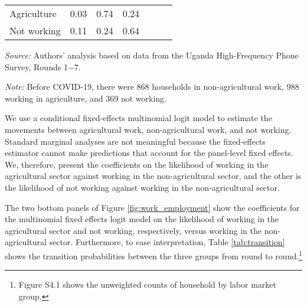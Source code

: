 \documentclass{wber}
\begin{document}
\begin{table}[hbtp!]
\begin{center}
\begin{footnotesize}
\begin{threeparttable}
\begin{tabular}{@{} l D{.}{.}{1.2} D{.}{.}{1.2} D{.}{.}{1.2}  D{.}{.}{1.2} D{.}{.}{1.2} D{.}{.}{1.2} @{}}
 Agriculture & 0.03 & 0.74 & 0.24 &  &  &  \\ 
 Not working & 0.11 & 0.24 & 0.64 &  &  &  \\ 
 \bottomrule
\end{tabular}
\begin{tablenotes}
\item \scriptsize \textit{Source:} Authors' analysis based on data from the Uganda High-Frequency Phone Survey, Rounds 1−7.
\item \scriptsize \textit{Note:} Before COVID-19, there were  868  households in non-agricultural work, 
988  working in agriculture, and  369  not working. 
\end{tablenotes}
\end{threeparttable}
\end{footnotesize}
\end{center}
\end{table}


We use a conditional fixed-effects multinomial logit model to estimate
the movements between agricultural work, non-agricultural work, and not
working. Standard marginal analyses are not meaningful because the
fixed-effects estimator cannot make predictions that account for the
panel-level fixed effects. We, therefore, present the coefficients on
the likelihood of working in the agricultural sector against working in
the non-agricultural sector, and the other is the likelihood of not
working against working in the non-agricultural sector.

The two bottom panels of Figure \ref{fig:work_employment} show the
coefficients for the multinomial fixed effects logit model on the
likelihood of working in the agricultural sector and not working,
respectively, versus working in the non-agricultural sector.
Furthermore, to ease interpretation, Table \ref{tab:transition} shows
the transition probabilities between the three groups from round to
round.\footnote{Figure S4.1 shows the
  unweighted counts of household by labor market group.}
\end{document}
